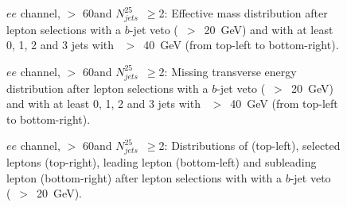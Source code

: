 \begin{figure}[h!]
\centering
{}
\caption{$ee$ channel, \met $>$ 60\GeV and $N_{jets}^{25}$~$\ge$2: Effective mass distribution after lepton selections with a $b$-jet veto (\pt~$>$~20~GeV) and with at least 0, 1, 2 and 3 jets with \pt~$>$~40~GeV (from top-left to bottom-right).}
\label{Fig:VP_ee_0b_Meff}
\end{figure}
\begin{figure}[h!]
\centering
{}
\caption{$ee$ channel, \met $>$ 60\GeV and $N_{jets}^{25}$~$\ge$2: Missing transverse energy distribution after lepton selections with a $b$-jet veto (\pt~$>$~20~GeV) and with at least 0, 1, 2 and 3 jets with \pt~$>$~40~GeV (from top-left to bottom-right).}
\label{Fig:VP_ee_0b_Met}
\end{figure}
\begin{figure}[h!]
\centering
{}
\caption{$ee$ channel, \met $>$ 60\GeV and $N_{jets}^{25}$~$\ge$2: Distributions of \mt (top-left), selected leptons \pt (top-right), leading lepton \pt (bottom-left) and subleading lepton \pt (bottom-right) after lepton selections with with a $b$-jet veto (\pt~$>$~20~GeV).}
\label{Fig:VP_ee_0b_Njets_and_other}
\end{figure} 



